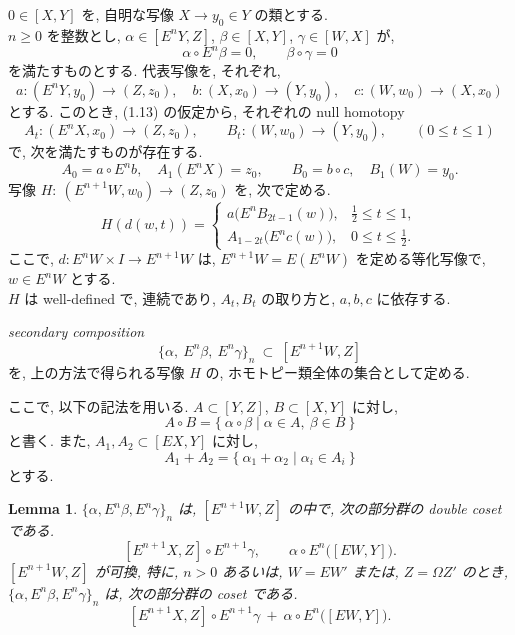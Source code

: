 \documentclass[12pt, leqno]{ltjsarticle}
\newcommand{\Ex}{E}        %
\numberwithin{equation}{section}
\theoremstyle{plain}
\newtheorem{lemma}[theorem]{Lemma}
\theoremstyle{definition}
\newtheorem{definition}[theorem]{Definition}
\theoremstyle{remark}
\begin{document}
$0\in[X, Y]$ を,
自明な写像 $X\to y_0\in Y$ の類とする. \\
$n\ge 0$ を整数とし, 
$\alpha\in[\Ex^n Y, Z]$, $\beta\in[X, Y]$, $\gamma\in[W, X]$ が,
\begin{equation}
\alpha\circ \Ex^n\beta=0,\qquad \beta\circ \gamma=0
\end{equation}
を満たすものとする. 代表写像を, それぞれ,
\[
a:(\Ex^n Y,y_0)\to (Z,z_0),\quad
b:(X,x_0)\to (Y,y_0),\quad
c:(W,w_0)\to (X,x_0)
\]
とする. 
このとき, (1.13) の仮定から, それぞれの null homotopy
\[
A_t:(\Ex^n X,x_0)\to (Z,z_0),\qquad
B_t:(W,w_0)\to (Y,y_0),\qquad (0\le t\le 1)
\]
で, 次を満たすものが存在する. 
\[
A_0=a\circ \Ex^n b,\quad A_1(\Ex^n X)=z_0,\qquad
B_0=b\circ c,\quad B_1(W)=y_0.
\]
写像 $H:\ (\Ex^{n+1}W,w_0)\to (Z,z_0)$ を, 次で定める. 
\begin{equation}\label{eq:H-def}
H(d(w,t))=
\begin{cases}
a\bigl(\Ex^n B_{2t-1}(w)\bigr), & \tfrac12\le t\le 1,\\[2mm]
A_{1-2t}\bigl(\Ex^n c(w)\bigr), & 0\le t\le \tfrac12.
\end{cases}
\end{equation}
ここで,
$d:\Ex^n W\times I\to \Ex^{n+1}W$ は,
\(E^{n+1}W= E(E^n W)\) を定める等化写像で, 
$w\in \Ex^n W$ とする.\\
$H$ は well-defined で, 連続であり, 
$A_t,B_t$ の取り方と, $a,b,c$ に依存する. 

\emph{secondary composition}
\[
\{\alpha,\ \Ex^n\beta,\ \Ex^n\gamma\}_n\ \subset\ [\Ex^{n+1}W, Z]
\]
を, 上の方法で得られる写像 $H$ の, 
ホモトピー類全体の集合として定める. 

ここで, 以下の記法を用いる. 
$A\subset[Y, Z]$, $B\subset[X, Y]$ に対し,
\[
A\circ B=\{\ \alpha\circ\beta\mid \alpha\in A,\ \beta\in B\ \}
\]
と書く. また, $A_1,A_2\subset[\Ex X, Y]$ に対し,
\[
A_1+A_2=\{\ \alpha_1+\alpha_2\mid \alpha_i\in A_i\ \}
\]
とする. 

\begin{lemma}\label{lem:double-coset}
$\{\alpha,\Ex^n\beta,\Ex^n\gamma\}_n$ は,
$[\Ex^{n+1}W, Z]$ の中で,
次の部分群の double coset である.
\[
[\Ex^{n+1}X, Z]\circ \Ex^{n+1}\gamma, \qquad
\alpha\circ \Ex^n\!\bigl([\Ex W, Y]\bigr).
\]
$[\Ex^{n+1}W, Z]$ が可換,
特に, $n>0$ あるいは, $W=\Ex W'$ または, $Z=\Omega Z'$ のとき, \\
\(
\{\alpha,\Ex^n\beta,\Ex^n\gamma\}_n
\)
は, 次の部分群の coset である.
\[
[\Ex^{n+1}X, Z]\circ \Ex^{n+1}\gamma \ +\ 
\alpha\circ \Ex^n\!\bigl([\Ex W, Y]\bigr).
\]
\end{lemma}
\end{document}
